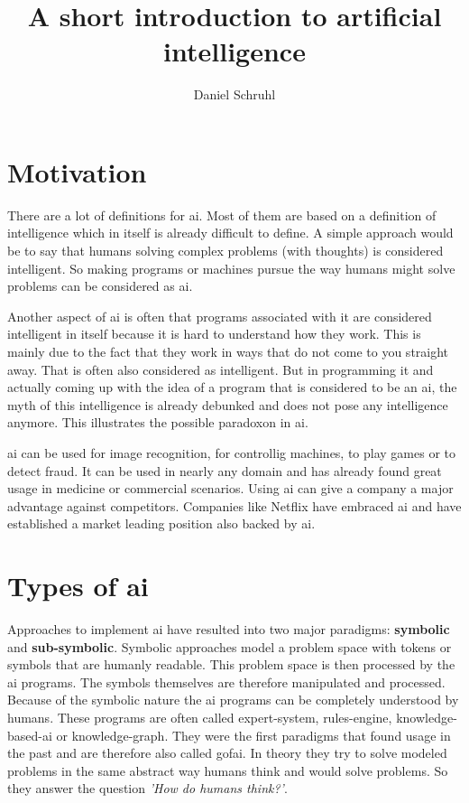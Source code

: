 \documentclass[jou,apacite]{apa6}
\title{A short introduction to artificial intelligence}
\author{Daniel Schruhl}
\affiliation{ThoughtWorks}
\begin{document}
\maketitle    
                        
\section{Motivation}
There are a lot of definitions for \gls{ai}. Most of them are based on a definition of intelligence which in itself is already difficult to define. A simple approach would be to say that humans solving complex problems (with thoughts) is considered intelligent. So making programs or machines pursue the way humans might solve problems can be considered as \gls{ai}.

Another aspect of \gls{ai} is often that programs associated with it are considered intelligent in itself because it is hard to understand how they work. This is mainly due to the fact that they work in ways that do not come to you straight away. That is often also considered as intelligent.
But in programming it and actually coming up with the idea of a program that is considered to be an \gls{ai}, the myth of this intelligence is already debunked and does not pose any intelligence anymore. This illustrates the possible paradoxon in \gls{ai}.

\gls{ai} can be used for image recognition, for controllig machines, to play games or to detect fraud. It can be used in nearly any domain and has already found great usage in medicine or commercial scenarios. Using \gls{ai} can give a company a major advantage against competitors. Companies like Netflix have embraced \gls{ai} \cite{Gomez-Uribe2015} and have established a market leading position also backed by \gls{ai}.

\section{Types of \gls{ai}}
Approaches to implement \gls{ai} have resulted into two major paradigms: \textbf{symbolic} and \textbf{sub-symbolic}. Symbolic approaches model a problem space with tokens or symbols that are humanly readable. This problem space is then processed by the \gls{ai} programs. The symbols themselves are therefore manipulated and processed. Because of the symbolic nature the \gls{ai} programs can be completely understood by humans. These programs are often called \gls{expert-system}, \gls{rules-engine}, \gls{knowledge-based-ai} or \gls{knowledge-graph}. They were the first paradigms that found usage in the past and are therefore also called \gls{gofai}. In theory they try to solve modeled problems in the same abstract way humans think and would solve problems. So they answer the question \textit{'How do humans think?'}.
\end{document}
